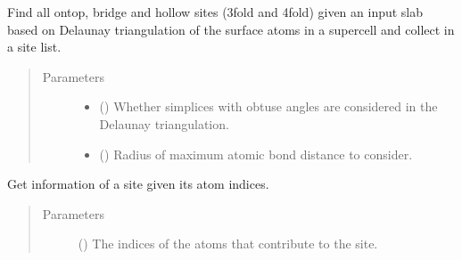 \documentclass[letterpaper,10pt,english]{sphinxmanual}
\begin{document}
\begin{fulllineitems}
\begin{fulllineitems}
\label{\detokenize{modules:acat.adsorption_sites.SlabAdsorptionSites.populate_site_list}}
Find all ontop, bridge and hollow sites (3\sphinxhyphen{}fold and 4\sphinxhyphen{}fold)
given an input slab based on Delaunay triangulation of the
surface atoms in a supercell and collect in a site list.
\begin{quote}\begin{description}
\item[{Parameters}] \leavevmode\begin{itemize}
\item {} 
 (\sphinxstyleliteralemphasis{\sphinxupquote{, }}) \textendash{} Whether simplices with obtuse angles are considered in the
Delaunay triangulation.

\item {} 
 (\sphinxstyleliteralemphasis{\sphinxupquote{, }}) \textendash{} Radius of maximum atomic bond distance to consider.

\end{itemize}

\end{description}\end{quote}

\end{fulllineitems}


\begin{fulllineitems}
\label{\detokenize{modules:acat.adsorption_sites.SlabAdsorptionSites.get_site}}
Get information of a site given its atom indices.
\begin{quote}\begin{description}
\item[{Parameters}] \leavevmode
{} () \textendash{} The indices of the atoms that contribute to the site.


\end{description}
\end{quote}
\end{fulllineitems}
\end{fulllineitems}
\end{document}
